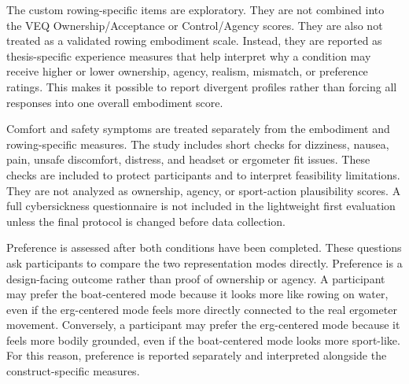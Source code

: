 %

The custom rowing-specific items are exploratory.
They are not combined into the VEQ Ownership/Acceptance or Control/Agency scores.
They are also not treated as a validated rowing embodiment scale.
Instead, they are reported as thesis-specific experience measures that help interpret why a condition may receive higher or lower ownership, agency, realism, mismatch, or preference ratings.
This makes it possible to report divergent profiles rather than forcing all responses into one overall embodiment score.

Comfort and safety symptoms are treated separately from the embodiment and rowing-specific measures.
The study includes short checks for dizziness, nausea, pain, unsafe discomfort, distress, and headset or ergometer fit issues.
These checks are included to protect participants and to interpret feasibility limitations.
They are not analyzed as ownership, agency, or sport-action plausibility scores.
A full cybersickness questionnaire is not included in the lightweight first evaluation unless the final protocol is changed before data collection.

Preference is assessed after both conditions have been completed.
These questions ask participants to compare the two representation modes directly.
Preference is a design-facing outcome rather than proof of ownership or agency.
A participant may prefer the boat-centered mode because it looks more like rowing on water, even if the erg-centered mode feels more directly connected to the real ergometer movement.
Conversely, a participant may prefer the erg-centered mode because it feels more bodily grounded, even if the boat-centered mode looks more sport-like.
For this reason, preference is reported separately and interpreted alongside the construct-specific measures.
